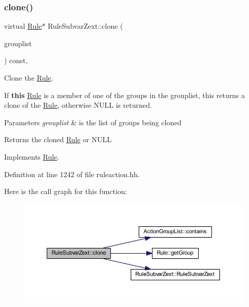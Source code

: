 \subsubsection{\texorpdfstring{clone()}{clone()}}
{\footnotesize\ttfamily virtual \mbox{\hyperlink{class_rule}{Rule}}$\ast$ Rule\+Subvar\+Zext\+::clone (\begin{DoxyParamCaption}\item[{const \mbox{\hyperlink{class_action_group_list}{Action\+Group\+List}} \&}]{grouplist }\end{DoxyParamCaption}) const\hspace{0.3cm}{\ttfamily [inline]}, {\ttfamily [virtual]}}



Clone the \mbox{\hyperlink{class_rule}{Rule}}. 

If {\bfseries{this}} \mbox{\hyperlink{class_rule}{Rule}} is a member of one of the groups in the grouplist, this returns a clone of the \mbox{\hyperlink{class_rule}{Rule}}, otherwise N\+U\+LL is returned. 
\begin{DoxyParams}{Parameters}
{\em grouplist} & is the list of groups being cloned \\
\hline
\end{DoxyParams}
\begin{DoxyReturn}{Returns}
the cloned \mbox{\hyperlink{class_rule}{Rule}} or N\+U\+LL 
\end{DoxyReturn}


Implements \mbox{\hyperlink{class_rule_a70de90a76461bfa7ea0b575ce3c11e4d}{Rule}}.



Definition at line 1242 of file ruleaction.\+hh.

Here is the call graph for this function\+:
\nopagebreak
\begin{figure}[H]
\begin{center}
\leavevmode
\includegraphics[width=350pt]{class_rule_subvar_zext_a2838537725e8d3dcb0c6bc0ce8fc1958_cgraph}
\end{center}
\end{figure}
\mbox{\label{class_rule_subvar_zext_aa109a86b21629b300a8650a94d47610d}} 

